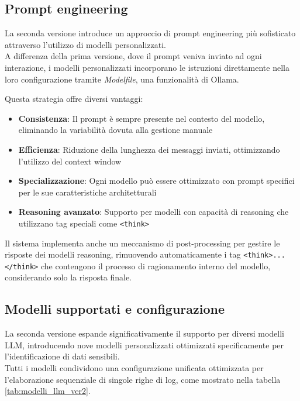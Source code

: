 \documentclass[12pt]{report}
\begin{document}
\subsection{Prompt engineering}
\label{subsec:ver2_prompt_engineering}

La seconda versione introduce un approccio di prompt engineering più sofisticato attraverso l'utilizzo di modelli personalizzati. \\
A differenza della prima versione, dove il prompt veniva inviato ad ogni interazione, i modelli personalizzati incorporano le istruzioni direttamente nella loro configurazione tramite \textit{Modelfile}, una funzionalità di Ollama.

Questa strategia offre diversi vantaggi:
\begin{itemize}
    \item \textbf{Consistenza}: Il prompt è sempre presente nel contesto del modello, eliminando la variabilità dovuta alla gestione manuale
    \item \textbf{Efficienza}: Riduzione della lunghezza dei messaggi inviati, ottimizzando l'utilizzo del context window
    \item \textbf{Specializzazione}: Ogni modello può essere ottimizzato con prompt specifici per le sue caratteristiche architetturali
    \item \textbf{Reasoning avanzato}: Supporto per modelli con capacità di reasoning che utilizzano tag speciali come \texttt{<think>}
\end{itemize}

Il sistema implementa anche un meccanismo di post-processing per gestire le risposte dei modelli reasoning, rimuovendo automaticamente i tag \texttt{<think>...</think>} che contengono il processo di ragionamento interno del modello, considerando solo la risposta finale.

\subsection{Modelli supportati e configurazione}
\label{subsec:ver2_modelli_supportati}

La seconda versione espande significativamente il supporto per diversi modelli LLM, introducendo nove modelli personalizzati ottimizzati specificamente per l'identificazione di dati sensibili. \\
Tutti i modelli condividono una configurazione unificata ottimizzata per l'elaborazione sequenziale di singole righe di log, come mostrato nella tabella \ref{tab:modelli_llm_ver2}.
\end{document}
